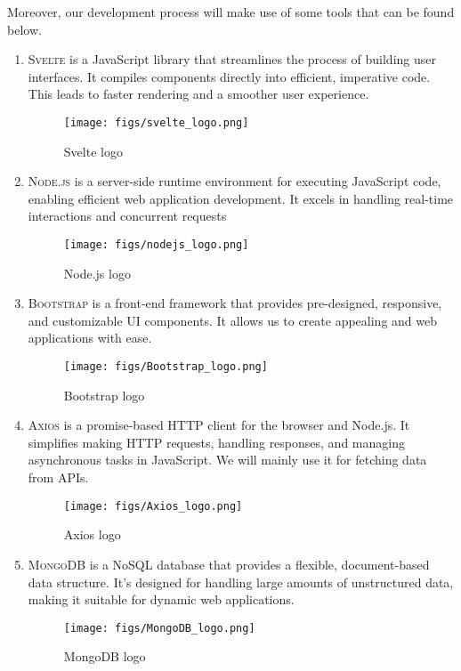 \documentclass[conference]{IEEEtran}
\begin{document}
Moreover, our development process will make use of some tools that can be found below.
\begin{enumerate}

    \item \textsc{Svelte} is a JavaScript library that streamlines the process of building user interfaces. It compiles components directly into efficient, imperative code. This leads to faster rendering and a smoother user experience.
    \begin{figure}[H]
    \centering
    \texttt{[image: figs/svelte\_logo.png]}
    \caption{Svelte logo}
    \label{fig:Svelte logo}
    \end{figure}

    \item \textsc{Node.js} is a server-side runtime environment for executing JavaScript code, enabling efficient web application development. It excels in handling real-time interactions and concurrent requests
    \begin{figure}[H]
    \centering
    \texttt{[image: figs/nodejs\_logo.png]}
    \caption{Node.js logo}
    \label{fig:Node.js logo}
    \end{figure}
    
    \item \textsc{Bootstrap} is a front-end framework that provides pre-designed, responsive, and customizable UI components. It allows us to create appealing and web applications with ease.
    \begin{figure}[H]
    \centering
    \texttt{[image: figs/Bootstrap\_logo.png]}
    \caption{Bootstrap logo}
    \label{fig:Bootstrap logo}
    \end{figure}
    
    \item \textsc{Axios} is a promise-based HTTP client for the browser and Node.js. It simplifies making HTTP requests, handling responses, and managing asynchronous tasks in JavaScript. We will mainly use it for fetching data from APIs.
    \begin{figure}[H]
    \centering
    \texttt{[image: figs/Axios\_logo.png]}
    \caption{Axios logo}
    \label{fig:Axios logo}
    \end{figure}
    
    \item \textsc{MongoDB} is a NoSQL database that provides a flexible, document-based data structure. It's designed for handling large amounts of unstructured data, making it suitable for dynamic web applications.
    \begin{figure}[H]
    \centering
    \texttt{[image: figs/MongoDB\_logo.png]}
    \caption{MongoDB logo}
    \label{fig:MongoDB logo}
    \end{figure}


\end{enumerate}
\end{document}
